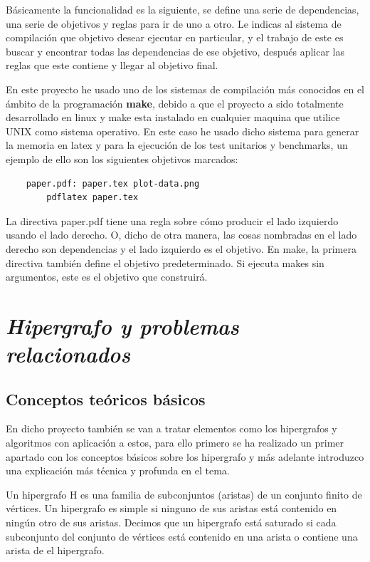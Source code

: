 \documentclass{cosas/tfg_domingo}
\begin{document}
Básicamente la funcionalidad es la siguiente, se define una serie de dependencias, una serie de objetivos y reglas para ir de uno a otro. Le indicas al sistema de compilación que objetivo desear ejecutar en particular, y el trabajo de este es buscar y encontrar todas las dependencias de ese objetivo, después aplicar las reglas que este contiene y llegar al objetivo final.

En este proyecto he usado uno de los sistemas de compilación más conocidos en el ámbito de la programación \textbf{make}, debido a que el proyecto a sido totalmente desarrollado en linux y make esta instalado en cualquier maquina que utilice UNIX como sistema operativo. En este caso he usado dicho sistema para generar la memoria en latex y para la ejecución de los test unitarios y benchmarks, un ejemplo de ello son los siguientes objetivos marcados:

\begin{verbatim}
    paper.pdf: paper.tex plot-data.png
	    pdflatex paper.tex
\end{verbatim}

La directiva paper.pdf tiene una regla sobre cómo producir el lado izquierdo usando el lado derecho. O, dicho de otra manera, las cosas nombradas en el lado derecho son dependencias y el lado izquierdo es el objetivo. En make, la primera directiva también define el objetivo predeterminado. Si ejecuta makes sin argumentos, este es el objetivo que construirá.



\chapter{\emph{Hipergrafo y problemas relacionados}}

\section{Conceptos teóricos básicos}
En dicho proyecto también se van a tratar elementos como los hipergrafos
y algoritmos con aplicación a estos, para ello primero se ha realizado un primer apartado con los conceptos básicos sobre los hipergrafo y más adelante introduzco una explicación más técnica y profunda en el tema.

Un hipergrafo H es una familia de subconjuntos (aristas) de un conjunto finito de vértices. Un hipergrafo es simple si ninguno de sus aristas está contenido en ningún otro de sus aristas. Decimos que un hipergrafo está saturado si cada subconjunto del conjunto de vértices está contenido en una arista o contiene una arista de el hipergrafo. \citep{Thomas}
\end{document}
